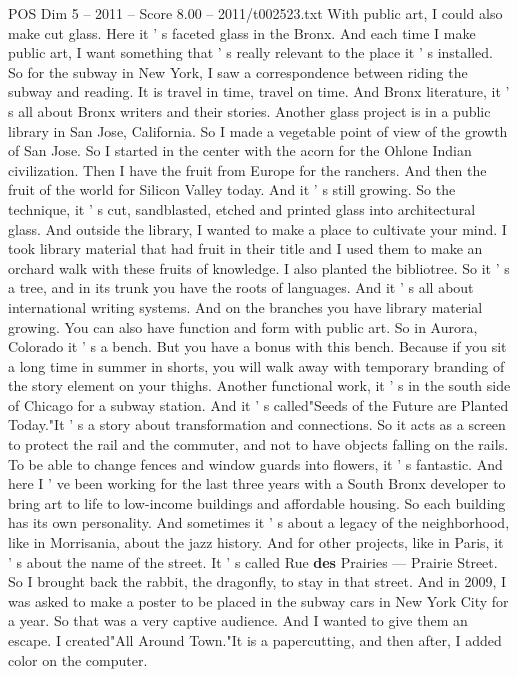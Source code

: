 \begin{textsample}{POS Dim 5 – 2011 – Score 8.00 – 2011/t002523.txt}
With public art, I could also make cut glass.
Here it ' s faceted glass in the Bronx.
And each time I make public art, I want something that ' s really relevant to the place it ' s installed.
So for the subway in New York, I saw a correspondence between riding the subway and reading.
It is travel in time, travel on time.
And Bronx literature, it ' s all about Bronx writers and their stories.
Another glass project is in a public library in San Jose, California.
So I made a vegetable point of view of the growth of San Jose.
So I started in the center with the acorn for the Ohlone Indian civilization.
Then I have the fruit from Europe for the ranchers.
And then the fruit of the world for Silicon Valley today.
And it ' s still growing.
So the technique, it ' s cut, sandblasted, etched and printed glass into architectural glass.
And outside the library, I wanted to make a place to cultivate your mind.
I took library material that had fruit in their title and I used them to make an orchard walk with these fruits of knowledge.
I also planted the bibliotree.
So it ' s a tree, and in its trunk you have the roots of languages.
And it ' s all about international writing systems.
And on the branches you have library material growing.
You can also have function and form with public art.
So in Aurora, Colorado it ' s a bench.
But you have a bonus with this bench.
Because if you sit a long time in summer in shorts, you will walk away with temporary branding of the story element on your thighs.
Another functional work, it ' s in the south side of Chicago for a subway station.
And it ' s called"Seeds of the Future are Planted Today."It ' s a story about transformation and connections.
So it acts as a screen to protect the rail and the commuter, and not to have objects falling on the rails.
To be able to change fences and window guards into flowers, it ' s fantastic.
And here I ' ve been working for the last three years with a South Bronx developer to bring art to life to low-income buildings and affordable housing.
So each building has its own personality.
And sometimes it ' s about a legacy of the neighborhood, like in Morrisania, about the jazz history.
And for other projects, like in Paris, it ' s about the name of the street.
It ' s called Rue \textbf{des} Prairies — Prairie Street.
So I brought back the rabbit, the dragonfly, to stay in that street.
And in 2009, I was asked to make a poster to be placed in the subway cars in New York City for a year.
So that was a very captive audience.
And I wanted to give them an escape.
I created"All Around Town."It is a papercutting, and then after, I added color on the computer.

\end{textsample}
